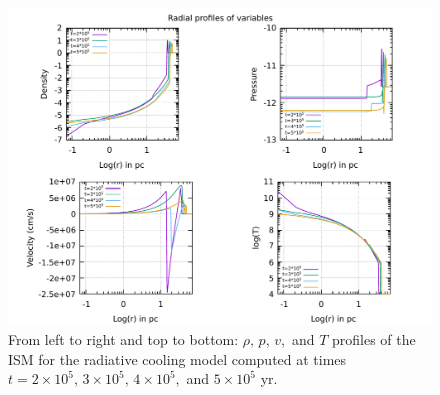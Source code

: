 \documentclass{article}
\begin{document}
\begin{figure}[H]
	\centering
	\includegraphics[width=1 \linewidth]{radialprofileshightcool.pdf}
	\caption{From left to right and top to bottom: $\rho,\,p,\,v,$ and $T$ profiles of the ISM for the radiative cooling model computed at times $t=2\times10^5,\,3\times10^5,\,4\times10^5,$ and $5\times10^5$ yr.}


	\label{fig:radialprhightcool}
\end{figure}
\end{document}

